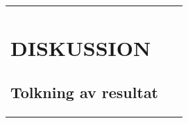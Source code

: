 \documentclass[a4paper,10pt]{article}
\begin{document}
{\begin{tabular}{ |l | l | l| }
\begin{centering}
\begin{centering}
\section{DISKUSSION}

\subsection{Tolkning av resultat}



\end{centering}
\end{centering}
\end{tabular}}
\end{document}

